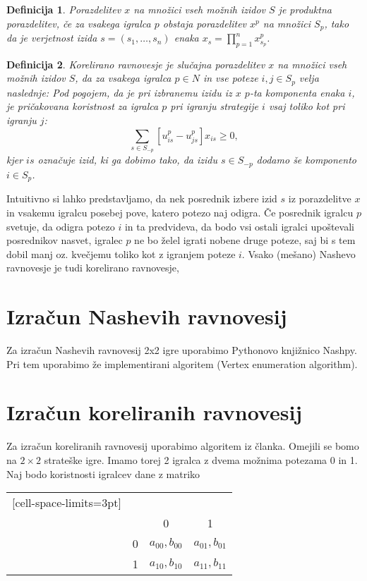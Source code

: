 \documentclass{article}
\newtheorem{definition}{Definicija}
\begin{document}
\begin{definition}
    Porazdelitev $x$ na množici vseh možnih izidov $S$ je \emph{produktna porazdelitev}, če za vsakega igralca $p$ obstaja porazdelitev $x^p$ na množici $S_p$, tako da je verjetnost izida $s = (s_1, \dots, s_n)$ enaka $x_s = \prod\limits_{p = 1}^n x_{s_p}^p$.
\end{definition}
\begin{definition}
    \emph{Korelirano ravnovesje} je slučajna porazdelitev $x$ na množici vseh možnih izidov $S$, da za vsakega igralca $p\in N$ in vse poteze $i,j\in S_p$ velja naslednje:
    Pod pogojem, da je pri izbranemu izidu iz $x$ $p$-ta komponenta enaka $i$, je pričakovana koristnost za igralca $p$ pri igranju strategije $i$ vsaj toliko kot pri igranju $j$:
    $$ \sum_{s\in S_{-p}} [u_{is}^p - u_{js}^p] x_{is} \geq 0, $$
kjer $is$ označuje izid, ki ga dobimo tako, da izidu $s \in S_{-p}$ dodamo še komponento $i\in S_p$.
\end{definition}

Intuitivno si lahko predstavljamo, da nek posrednik izbere izid $s$ iz porazdelitve $x$ in vsakemu igralcu posebej pove, katero potezo naj odigra. Če posrednik igralcu $p$ svetuje, da odigra potezo $i$ in ta predvideva, da bodo vsi ostali igralci upoštevali posrednikov nasvet, igralec $p$ ne bo želel igrati nobene druge poteze, saj bi s tem dobil manj oz. kvečjemu toliko kot z igranjem poteze $i$. Vsako (mešano) Nashevo ravnovesje je tudi korelirano ravnovesje, 

\section{Izračun Nashevih ravnovesij}
Za izračun Nashevih ravnovesij 2x2 igre uporabimo Pythonovo knjižnico Nashpy. Pri tem uporabimo že implementirani algoritem (Vertex enumeration algorithm).
\section{Izračun koreliranih ravnovesij}
Za izračun koreliranih ravnovesij uporabimo algoritem iz članka. Omejili se bomo na $2\times 2$ strateške igre. Imamo torej 2 igralca z dvema možnima potezama 0 in 1. Naj bodo koristnosti igralcev dane z matriko

\begin{NiceTabular}{cccc}[cell-space-limits=3pt]
    &     &  \\
    &     & 0     & 1 \\ 
    & 0 & 
          $a_{00}, b_{00}$ & $a_{01},b_{01}$ \\
    & 1 & $a_{10},b_{10}$ & $a_{11},b_{11} $
\end{NiceTabular}
\end{document}
